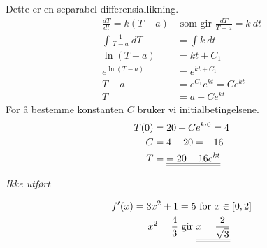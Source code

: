 \documentclass[a4paper,norsk,12pt]{article}
\begin{document}
Dette er en separabel differensiallikning.
\begin{align*}
  \frac{dT}{dt}  = k(T-a) & \text{ som gir }
  \frac{dT}{T-a}  = k~dt \\
  \int{\frac{1}{T-a}~dT} & = \int{ k~dt } \\
  \ln{(T-a)} & = kt + C_1 \\
  e^{\ln{(T-a)}} & = e^{kt + C_1} \\
  T-a & = e^{C_1} e^{kt} = Ce^{kt} \\
  T & = a + Ce^{kt}
\end{align*}
For å bestemme konstanten $C$ bruker vi initialbetingelsene.
\begin{align*}
  T(0) &= 20 + Ce^{k\cdot0} = 4 \\
  C &= 4 - 20 = -16 \\
  T &= {\underline{\underline{ = 20 - 16e^{kt}}}}
\end{align*}

\textit{Ikke utført}


\begin{align*}
  f'(x) = 3x^2 + 1 & = 5 \text{ for } x \in [0,2]\\
  x^2 = \frac{4}{3} & \text{ gir }
  \svar{x = \frac{2}{\sqrt{3}}}
\end{align*}
\end{document}
